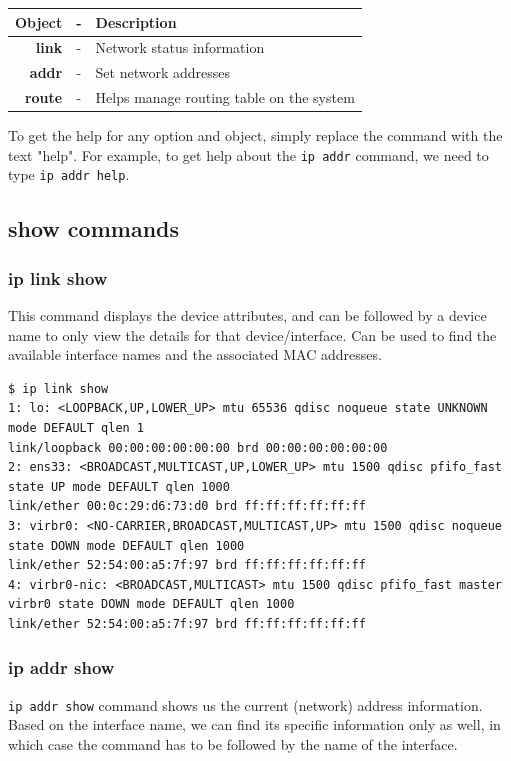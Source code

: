 \vspace{-10pt}
\begin{center}
	\begin{tabular}{rcl}
		\toprule
		\textbf{Object} &- &\textbf{Description} \\
		\midrule
		\textbf{link} &- &Network status information \\
		\textbf{addr} &- &Set network addresses \\
		\textbf{route} &- &Helps manage routing table on the system \\
	\end{tabular}
\end{center}
\vspace{-10pt}

\noindent
To get the help for any option and object, simply replace the command with the text "help". For example, to get help about the \verb|ip addr| command, we need to type \verb|ip addr help|.

\subsection{show commands}
\subsubsection{ip link show} \vspace{-10pt}
This command displays the device attributes, and can be followed by a device name to only view the details for that device/interface. Can be used to find the available interface names and the associated MAC addresses.

\vspace{-15pt}
\begin{verbatim}
$ ip link show
1: lo: <LOOPBACK,UP,LOWER_UP> mtu 65536 qdisc noqueue state UNKNOWN mode DEFAULT qlen 1
link/loopback 00:00:00:00:00:00 brd 00:00:00:00:00:00
2: ens33: <BROADCAST,MULTICAST,UP,LOWER_UP> mtu 1500 qdisc pfifo_fast state UP mode DEFAULT qlen 1000
link/ether 00:0c:29:d6:73:d0 brd ff:ff:ff:ff:ff:ff
3: virbr0: <NO-CARRIER,BROADCAST,MULTICAST,UP> mtu 1500 qdisc noqueue state DOWN mode DEFAULT qlen 1000
link/ether 52:54:00:a5:7f:97 brd ff:ff:ff:ff:ff:ff
4: virbr0-nic: <BROADCAST,MULTICAST> mtu 1500 qdisc pfifo_fast master virbr0 state DOWN mode DEFAULT qlen 1000
link/ether 52:54:00:a5:7f:97 brd ff:ff:ff:ff:ff:ff
\end{verbatim}
\vspace{-10pt}

\subsubsection{ip addr show} \vspace{-10pt}
\verb|ip addr show| command shows us the current (network) address information. Based on the interface name, we can find its specific information only as well, in which case the command has to be followed by the name of the interface. 

